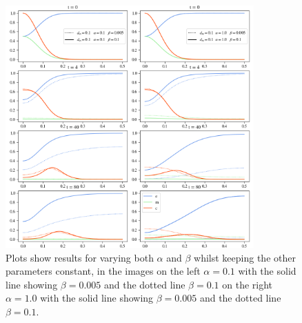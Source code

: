 \begin{figure}[h]
    \centering
    \includegraphics[width=0.85\textwidth]{resources/images/dm_alpha_beta_variation_2.png}
    \caption{Plots show results for varying both $\alpha$ and $\beta$ whilst keeping the other parameters constant, in the images on the left $\alpha=0.1$ with the solid line showing $\beta = 0.005$ and the dotted line $\beta=0.1$ on the right $\alpha=1.0$ with the solid line showing $\beta = 0.005$ and the dotted line $\beta=0.1$.}
    \label{fig:alpha_beta_variation}
\end{figure}
